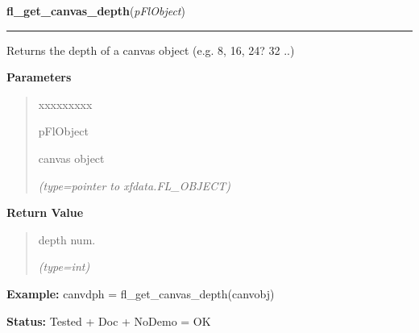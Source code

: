 \hspace{.8\funcindent}\begin{boxedminipage}{\funcwidth}

    \raggedright \textbf{fl\_get\_canvas\_depth}(\textit{pFlObject})

    \vspace{-1.5ex}

    \rule{\textwidth}{0.5\fboxrule}
\setlength{\parskip}{2ex}
    Returns the depth of a canvas object (e.g. 8, 16, 24? 32 ..)

\setlength{\parskip}{1ex}
      \textbf{Parameters}
      \vspace{-1ex}

      \begin{quote}
        \begin{Ventry}{xxxxxxxxx}

          \item[pFlObject]

          canvas object

            {\it (type=pointer to xfdata.FL\_OBJECT)}

        \end{Ventry}

      \end{quote}

      \textbf{Return Value}
    \vspace{-1ex}

      \begin{quote}
      depth num.

      {\it (type=int)}

      \end{quote}

\textbf{Example:} canvdph = fl\_get\_canvas\_depth(canvobj)



\textbf{Status:} Tested + Doc + NoDemo = OK



    \end{boxedminipage}

    \label{xformslib:flcanvas:fl_remove_canvas_handler}

    \vspace{0.5ex}

